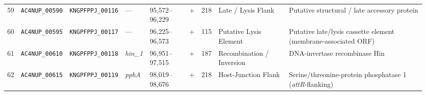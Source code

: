 \begin{landscape}
\begin{xltabular}{\linewidth}{cp{2.4cm}p{2.4cm}p{1.4cm}p{2.6cm}crp{3.2cm}X}
59 & \texttt{AC4NUP\_00590} & \texttt{KNGPFPPJ\_00116} & --- & 95,572--96,229 & + & 218 & Late / Lysis Flank & Putative structural / late accessory protein \\
60 & \texttt{AC4NUP\_00595} & \texttt{KNGPFPPJ\_00117} & --- & 96,225--96,573 & + & 115 & Putative Lysis Element & Putative late/lysis cassette element (membrane-associated ORF) \\
61 & \texttt{AC4NUP\_00610} & \texttt{KNGPFPPJ\_00118} & \textit{hin\_1} & 96,951--97,515 & + & 187 & Recombination / Inversion & DNA-invertase recombinase Hin \\
62 & \texttt{AC4NUP\_00615} & \texttt{KNGPFPPJ\_00119} & \textit{pphA} & 98,019--98,676 & + & 218 & Host-Junction Flank & Serine/threonine-protein phosphatase 1 (\textit{attR}-flanking) \\
\end{xltabular}
\end{landscape}
